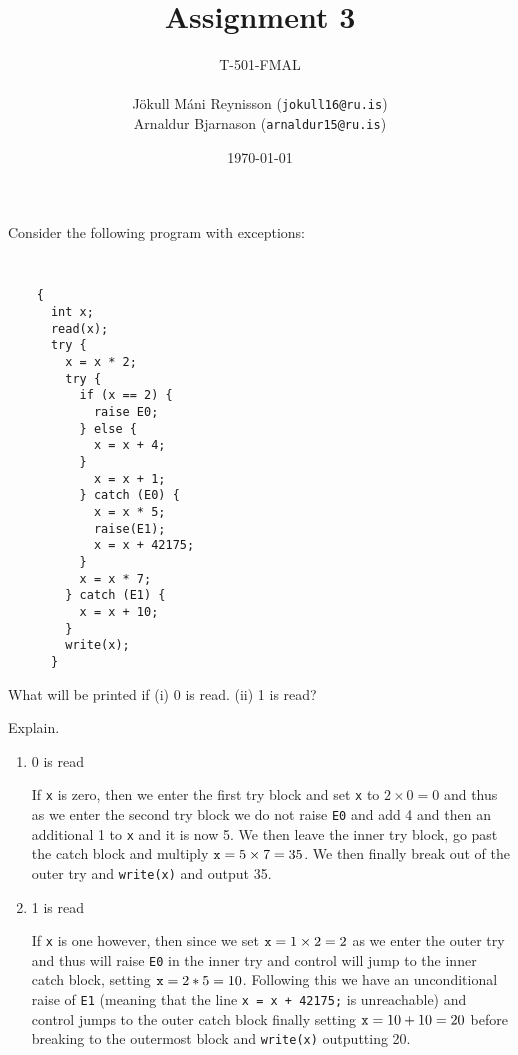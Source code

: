 \documentclass[11pt]{exam}
\begin{document}
\title{Assignment 3}
    \author{{\small T-501-FMAL} \\ \quad \\ Jökull Máni Reynisson ({\tt jokull16@ru.is}) \\  Arnaldur Bjarnason ({\tt arnaldur15@ru.is})}
\date{\today}
\maketitle

\begin{questions}


\question Consider the following program with exceptions:
{\tt
  \begin{lstlisting}
    {
      int x;
      read(x);
      try {
        x = x * 2;
        try {
          if (x == 2) {
            raise E0;
          } else {
            x = x + 4;
          }
            x = x + 1;
          } catch (E0) {
            x = x * 5;
            raise(E1);
            x = x + 42175;
          }
          x = x * 7;
        } catch (E1) {
          x = x + 10;
        }
        write(x);
      }
  \end{lstlisting}
}
What will be printed if (i) 0 is read. (ii) 1 is read?

Explain.

        \begin{enumerate}[label=(\roman*)]
            \item 0 is read
                \begin{framed}
                    If {\tt x} is zero, then we enter the first try block and set {\tt x} to $2\times 0 = 0$ and thus as we enter the second try block we do not raise {\tt E0} and add 4 and then an additional 1 to {\tt x} and it is now 5. We then leave the inner try block, go past the catch block and multiply ${\tt x} = 5 \times 7 = 35$.
                    We then finally break out of the outer try and {\tt write(x)} and output 35.
                \end{framed}

            \item 1 is read
                \begin{framed}
                    If {\tt x} is one however, then since we set ${\tt x} = 1 \times 2 = 2$ as we enter the outer try and thus will raise {\tt E0} in the inner try and control will jump to the inner catch block, setting ${\tt x} = 2 * 5 = 10$. Following this we have an unconditional raise of {\tt E1} (meaning that the line {\tt x = x + 42175;} is unreachable) and control jumps to the outer catch block finally setting ${\tt x} = 10 + 10 = 20$ before breaking to the outermost block and {\tt write(x)} outputting 20.
                \end{framed}
        \end{enumerate}




\end{questions}
\end{document}

